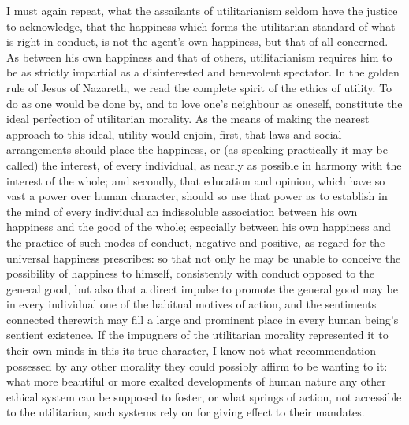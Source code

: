 I must again repeat, what the assailants of utilitarianism seldom have
the justice to acknowledge, that the happiness which forms the
utilitarian standard of what is right in conduct, is not the agent's
own happiness, but that of all concerned. As between his own happiness
and that of others, utilitarianism requires him to be as strictly
impartial as a disinterested and benevolent spectator. In the golden
rule of Jesus of Nazareth, we read the complete spirit of the ethics
 of utility. To do as one would be done by, and to love one's
neighbour as oneself, constitute the ideal perfection of utilitarian
morality. As the means of making the nearest approach to this ideal,
utility would enjoin, first, that laws and social arrangements should
place the happiness, or (as speaking practically it may be called) the
interest, of every individual, as nearly as possible in harmony with
the interest of the whole; and secondly, that education and opinion,
which have so vast a power over human character, should so use that
power as to establish in the mind of every individual an indissoluble
association between his own happiness and the good of the whole;
especially between his own happiness and the practice of such modes of
conduct, negative and positive, as regard for the universal happiness
prescribes: so that not only he may be unable to conceive the
possibility of happiness to himself, consistently with conduct opposed
to the general good, but also that a direct impulse to promote the
general good may be in every individual one of the habitual motives of
action, and the sentiments connected therewith may fill a large and
prominent place in every human being's sentient existence. If the
impugners of the utilitarian morality represented it to their own
minds in this its true character, I know not what recommendation
possessed by any other morality they could possibly affirm to be
wanting to it: what more beautiful or more exalted developments of
human nature any other ethical system can be supposed to foster, or
what springs of action, not accessible to the utilitarian, such
systems rely on for giving effect to their mandates.

